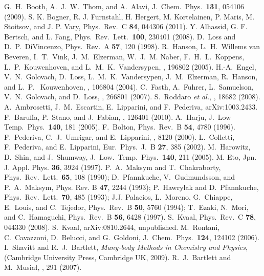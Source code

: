 \documentclass[twocolumn]{revtex4}
\begin{document}
\begin{thebibliography}{200}
G.~H.~Booth, A.~J.~W.~Thom, and A.~Alavi, J.~Chem.~Phys.~{\bf 131}, 054106 (2009). 
 S. K. Bogner, R. J. Furnstahl, H. Hergert, M. Kortelainen, P. Maris, M. Stoitsov, and J. P. Vary, Phys.~Rev.~C {\bf 84}, 044306 (2011).
 Y. Alhassid, G. F. Bertsch, and L. Fang, Phys.~Rev.~Lett.~{\bf 100}, 230401 (2008).
 D.~Loss and D.~P.~DiVincenzo, Phys.~Rev.~A {\bf 57}, 120 (1998).
 R.~Hanson, L.~H.~Willems van Beveren, I.~T.~Vink, J.~M.~Elzerman, W.~J.~M. Naber, F.~H.~L.~Koppens, L.~P.~Kouwenhoven, and L.~M.~K.~Vandersypen, , 196802 (2005).
 H.-A.~Engel, V.~N.~Golovach, D.~Loss, L.~M.~K.~Vandersypen, J.~M.~Elzerman, R.~Hanson, and L.~P.~ Kouwenhoven, , 106804 (2004). 
 C.~Fasth, A.~Fuhrer, L.~Samuelson, V.~N.~Golovach, and D.~Loss, , 266801 (2007).
 S.~Roddaro {\em et al.}, , 18682 (2008).
A.~Ambrosetti, J.~M.~Escartin, E.~Lipparini, and F.~Pederiva, arXiv:1003.2433.
 F.~Baruffa, P.~Stano, and J.~Fabian, , 126401 (2010).
 A.~Harju, J.~Low Temp.~Phys.~{\bf 140}, 181 (2005).
 F.~Bolton, Phys.~Rev.~B {\bf 54}, 4780 (1996).
F.~Pederiva, C.~J.~Umrigar, and E.~Lipparini, , 8120 (2000).
L.~Colletti, F.~Pederiva, and  E.~Lipparini,  Eur.~Phys.~J.~B {\bf 27}, 
385 (2002).
 M.~Harowitz, D.~Shin, and J.~Shumway, J.~Low.~Temp.~Phys.~{\bf 140}, 211 (2005).
 M. Eto, Jpn. J. Appl. Phys. {\bf 36}, 3924 (1997).
 P.~A.~Maksym and T.~Chakraborty, Phys.~Rev.~Lett.~{\bf 65}, 108 (1990);
D.~Pfannkuche, V.~Gudmundsson, and P.~A.~Maksym, Phys. Rev. B {\bf 47}, 2244 (1993);
P.~Hawrylak and D.~Pfannkuche, Phys.~Rev.~Lett.~{\bf 70}, 485 (1993); J.J. Palacios,
L.~Moreno, G.~Chiappe, E.~Louis, and C.~Tejedor, Phys.~Rev.~B {\bf 50}, 5760 (1994);
T.~Ezaki, N.~Mori, and C.~Hamaguchi, Phys.~Rev.~B {\bf 56}, 6428 (1997).
 S.~Kvaal, Phys.~Rev.~C {\bf 78}, 044330 (2008).
 S.~Kvaal, arXiv:0810.2644, unpublished.
 M.~Rontani, C.~Cavazzoni, 
D.~Belucci, and G.~Goldoni, J.~Chem.~Phys.~{\bf 124}, 124102 (2006).
 I.~Shavitt and R.\ J.\ Bartlett, {\em Many-body Methods in Chemistry and Physics},  
(Cambridge University Press, Cambridge UK, 2009). 
 R.\ J.\ Bartlett and M.\ Musia{\l}, , 291 (2007).

\end{thebibliography}
\end{document}
